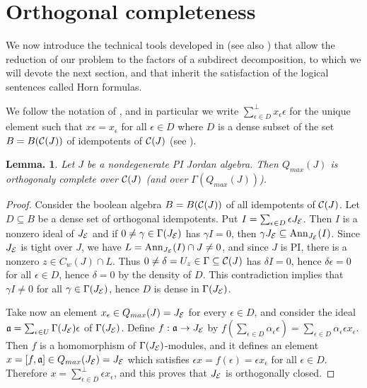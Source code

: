 \documentclass[a4paper,twoside,11pt]{article}
\theoremstyle{plain}
\theoremstyle{miestilo}
\newtheorem{lema}[subsection]{Lemma.}
\theoremstyle{misnotas}
\begin{document}
\section{Orthogonal completeness}

We now introduce the technical tools developed in \cite{bmi} (see also \cite{bmami}) that allow the reduction of our problem to the factors of a subdirect decomposition, to which we will devote the next section, and that inherit the satisfaction of the logical sentences called Horn formulas.

We follow the notation of \cite{bmami}, and in particular we write $ \sum_{\epsilon\in
D}^{\perp}x_{\epsilon} \epsilon$ for the unique element such that $x \epsilon=x_{\epsilon}$ for all $\epsilon \in D$ where $D$ is a dense subset of the set $B=B({\cal{C}}(J))$ of idempotents of ${\cal{C}}(J)$ (see \cite[3.1.5]{bmami}).

\begin{lema}\label{ocquot}Let $J$ be a nondegenerate PI Jordan algebra. Then $Q_{max}(J)$ is
orthogonaly complete over $\mathcal C(J)$ (and over $\Gamma(Q_{max}(J))$).\end{lema}

\begin{proof} Consider the boolean algebra $B = B(\mathcal C(J))$ of all idempotents of $\mathcal C(J)$. Let $D
\subseteq B$ be a dense set of orthogonal idempotents. Put $I= \sum_{\epsilon\in
D}\epsilon J_\mathcal E$. Then $I$ is a nonzero ideal of $J_\mathcal E$ and if $0 \ne \gamma \in
\Gamma(J_\mathcal E)$ has $\gamma I = 0$, then $\gamma J_\mathcal E \subseteq {\rm Ann}_{J_\mathcal E}(I)$. Since
$J_\mathcal E$ is tight over $J$, we have $L = {\rm Ann}_{J_\mathcal E}(I)\cap J \ne 0$, and since $J$ is
PI, there is a nonzero $z \in C_w(J)\cap L$. Thus $0 \ne \delta = U_z\in \Gamma \subseteq
\mathcal C(J)$ has $\delta I = 0$, hence $\delta \epsilon = 0$ for all $\epsilon \in D$, hence
$\delta = 0$ by the density of $D$. This contradiction implies that $\gamma I \ne 0$ for
all $\gamma \in \Gamma(J_\mathcal E)$, hence $D$ is dense in $\Gamma(J_\mathcal E)$.

Take now an element $x_\epsilon \in Q_{max}(J) = J_\mathcal E$ for every $\epsilon \in D$, and
consider the ideal $\frak a = \sum_{\epsilon \in U}\Gamma(J_\mathcal E)\epsilon$ of $\Gamma(J_\mathcal E)$.
Define $f: \frak a \rightarrow J_\mathcal E$ by $f(\sum_{\epsilon \in D}\alpha_\epsilon\epsilon) =
\sum_{\epsilon \in D}\alpha_\epsilon\epsilon x_\epsilon$. Then $f$ is a homomorphism of
$\Gamma(J_\mathcal E)$-modules, and it defines an element $x =[f,\frak a] \in Q_{max}(J_\mathcal E) = J_\mathcal E$
which satisfies $\epsilon x = f(\epsilon) = \epsilon x_\epsilon$ for all $\epsilon \in D$.
Therefore $x = \sum^{\perp}_{\epsilon \in D}\epsilon x_\epsilon$, and this proves that
$J_\mathcal E$ is orthogonally closed.\end{proof}
\end{document}
